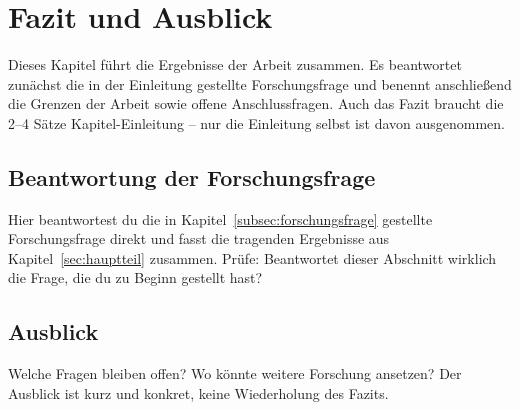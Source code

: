 \section{Fazit und Ausblick}
\label{sec:fazit}

Dieses Kapitel führt die Ergebnisse der Arbeit zusammen. Es beantwortet
zunächst die in der Einleitung gestellte Forschungsfrage und benennt
anschließend die Grenzen der Arbeit sowie offene Anschlussfragen. Auch das
Fazit braucht die 2--4 Sätze Kapitel-Einleitung -- nur die Einleitung selbst
ist davon ausgenommen.

\subsection{Beantwortung der Forschungsfrage}
\label{subsec:beantwortung}

Hier beantwortest du die in Kapitel~\ref{subsec:forschungsfrage} gestellte
Forschungsfrage direkt und fasst die tragenden Ergebnisse aus
Kapitel~\ref{sec:hauptteil} zusammen. Prüfe: Beantwortet dieser Abschnitt
wirklich die Frage, die du zu Beginn gestellt hast?

\subsection{Ausblick}
\label{subsec:ausblick}

Welche Fragen bleiben offen? Wo könnte weitere Forschung ansetzen? Der Ausblick
ist kurz und konkret, keine Wiederholung des Fazits.

